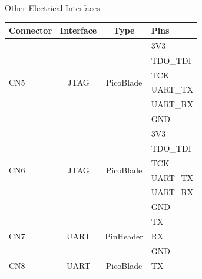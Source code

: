 \begin{frame}{Other Electrical Interfaces}

    \begin{table}[!htb]\tiny
        \centering
        \label{tab:icd}
        \begin{tabular}{lccl}
            \toprule[1.5pt]
            \textbf{Connector} & \textbf{Interface} & \textbf{Type} & \textbf{Pins} \\
            \midrule
            \multirow{6}{*}{CN5} & \multirow{6}{*}{JTAG} & \multirow{6}{*}{PicoBlade} & 3V3 \\
                                 &                       &                            & TDO\_TDI \\
                                 &                       &                            & TCK \\
                                 &                       &                            & UART\_TX \\
                                 &                       &                            & UART\_RX \\
                                 &                       &                            & GND \\
            \midrule
            \multirow{6}{*}{CN6} & \multirow{6}{*}{JTAG} & \multirow{6}{*}{PicoBlade} & 3V3 \\
                                 &                       &                            & TDO\_TDI \\
                                 &                       &                            & TCK \\
                                 &                       &                            & UART\_TX \\
                                 &                       &                            & UART\_RX \\
                                 &                       &                            & GND \\
            \midrule
            \multirow{3}{*}{CN7} & \multirow{3}{*}{UART} & \multirow{3}{*}{PinHeader} & TX \\
                                 &                       &                            & RX \\
                                 &                       &                            & GND \\
            \midrule
            \multirow{3}{*}{CN8} & \multirow{3}{*}{UART} & \multirow{3}{*}{PicoBlade} & TX \\

\end{tabular}
\end{table}
\end{frame}
